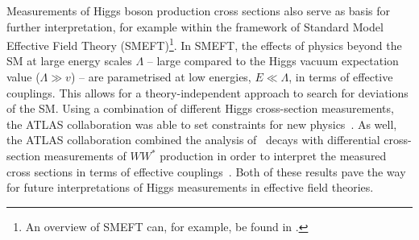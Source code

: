 Measurements of Higgs boson production cross sections also serve as basis for further interpretation, for example within the framework of Standard Model Effective Field Theory (SMEFT)\footnote{An overview of SMEFT can, for example, be found in \ccite{}.}. In SMEFT, the effects of physics beyond the SM at large energy scales $\Lambda$ -- large compared to the Higgs vacuum expectation value ($\Lambda \gg v$) -- are parametrised at low energies, $E \ll \Lambda$, in terms of effective couplings. 
This allows for a theory-independent approach to search for deviations of the SM. 
Using a combination of different Higgs cross-section measurements, the ATLAS collaboration was able to set constraints for new physics~\cite{ATLAS-CONF-2020-053}.
As well, the ATLAS collaboration combined the analysis of \HWW\ decays with differential cross-section measurements of $WW^*$ production in order to interpret the measured cross sections in terms of effective couplings~\cite{ATL-PHYS-PUB-2021-010}.
Both of these results pave the way for future interpretations of Higgs measurements in effective field theories. %





